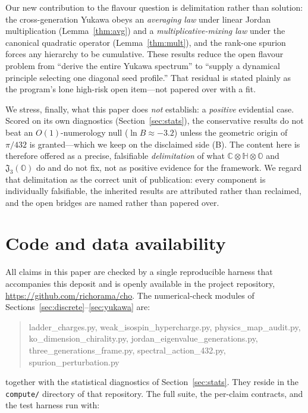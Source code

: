 \documentclass[11pt,a4paper]{article}
\theoremstyle{plain}
\newcommand{\CHO}{\mathbb{C}\otimes\mathbb{H}\otimes\mathbb{O}}
\newcommand{\JO}{\mathfrak{J}_3(\mathbb{O})}
\newcommand{\code}[1]{\texttt{#1}}
\begin{document}
Our new contribution to the flavour question is delimitation rather than
solution: the cross-generation Yukawa obeys an \emph{averaging law} under linear Jordan
multiplication (Lemma~\ref{thm:avg}) and a \emph{multiplicative-mixing law} under
the canonical quadratic operator (Lemma~\ref{thm:mult}), and the rank-one spurion
forces any hierarchy to be cumulative. These results reduce the open flavour problem from ``derive the entire
Yukawa spectrum'' to ``supply a dynamical principle selecting one diagonal seed
profile.'' That residual is stated plainly as the program's lone high-risk open
item---not papered over with a fit.

We stress, finally, what this paper does \emph{not} establish: a \emph{positive}
evidential case. Scored on its own diagnostics (Section~\ref{sec:stats}), the
conservative results do not beat an $O(1)$-numerology null ($\ln B \approx -3.2$)
unless the
geometric origin of $\pi/432$ is granted---which we keep on the disclaimed side
(B). The content here is therefore offered as a precise, falsifiable
\emph{delimitation} of what $\CHO$ and $\JO$ do and do not fix, not as positive
evidence for the framework. We regard that delimitation as the correct unit of
publication: every component is individually falsifiable, the inherited results
are attributed rather than reclaimed, and the open bridges are named rather than
papered over.

\section*{Code and data availability}

All claims in this paper are checked by a single reproducible harness that
accompanies this deposit and is openly available in the project repository,
\url{https://github.com/richorama/cho}. The numerical-check modules of
Sections~\ref{sec:discrete}--\ref{sec:yukawa} are:

\begin{quote}\ttfamily\small\raggedright
ladder\_charges.py, weak\_isospin\_hypercharge.py, physics\_map\_audit.py,
ko\_dimension\_chirality.py, jordan\_eigenvalue\_generations.py,
three\_generations\_frame.py, spectral\_action\_432.py, spurion\_perturbation.py
\end{quote}

\noindent together with the statistical diagnostics of Section~\ref{sec:stats}.
They reside in the \code{compute/} directory of that repository. The full
suite, the per-claim contracts, and the test harness run with:
\end{document}
